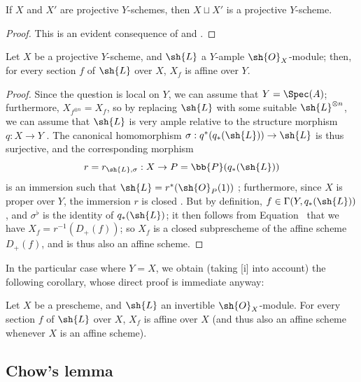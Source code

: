 \begin{proposition}[5.5.6]
\label{II.5.5.6}
If $X$ and $X'$ are projective $Y$-schemes, then $X\sqcup X'$ is a projective $Y$-scheme.
\end{proposition}

\begin{proof}
This is an evident consequence of  and .
\end{proof}

\begin{proposition}[5.5.7]
\label{II.5.5.7}
Let $X$ be a projective $Y$-scheme, and $\sh{L}$ a $Y$-ample $\sh{O}_X$-module; then, for every section $f$ of $\sh{L}$ over $X$, $X_f$ is affine over $Y$.
\end{proposition}

\begin{proof}
Since the question is local on $Y$, we can assume that $Y=\Spec(A)$; furthermore, $X_{f^{\otimes n}}=X_f$, so by replacing $\sh{L}$ with some suitable $\sh{L}^{\otimes n}$, we can assume that $\sh{L}$ is very ample relative to the structure morphism $q:X\to Y$ .
The canonical homomorphism $\sigma:q^*(q_*(\sh{L}))\to\sh{L}$ is thus surjective, and the corresponding morphism
\[
  r=r_{\sh{L},\sigma}:X\to P=\bb{P}(q_*(\sh{L}))
\]
is an immersion such that $\sh{L}=r^*(\sh{O}_P(1))$ ; furthermore, since $X$ is proper over $Y$, the immersion $r$ is closed .
But by definition, $f\in\Gamma(Y,q_*(\sh{L}))$, and $\sigma^\flat$ is the identity of $q_*(\sh{L})$; it then follows from Equation~ that we have $X_f=r^{-1}(D_+(f))$;
so $X_f$ is a closed subprescheme of the affine scheme $D_+(f)$, and is thus also an affine scheme.
\end{proof}

In the particular case where $Y=X$, we obtain (taking [i] into account) the following corollary, whose direct proof is immediate anyway:
\begin{corollary}[5.5.8]
\label{II.5.5.8}
Let $X$ be a prescheme, and $\sh{L}$ an invertible $\sh{O}_X$-module.
For every section $f$ of $\sh{L}$ over $X$, $X_f$ is affine over $X$ (and thus also an affine scheme whenever $X$ is an affine scheme).
\end{corollary}

\subsection{Chow's lemma}
\label{subsection:II.5.6}

